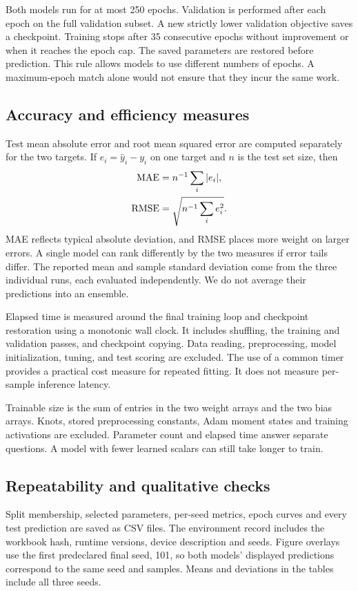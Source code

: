 \documentclass[11pt,twocolumn,letterpaper]{article}
\begin{document}
Both models run for at most 250 epochs. Validation is performed after each epoch on the full validation subset. A new strictly lower validation objective saves a checkpoint. Training stops after 35 consecutive epochs without improvement or when it reaches the epoch cap. The saved parameters are restored before prediction. This rule allows models to use different numbers of epochs. A maximum-epoch match alone would not ensure that they incur the same work.

\subsection{Accuracy and efficiency measures}
Test mean absolute error and root mean squared error are computed separately for the two targets. If \(e_i=\widehat y_i-y_i\) on one target and \(n\) is the test set size, then
\begin{align}
 {\rm MAE}&=n^{-1}\sum_i |e_i|,\\
 {\rm RMSE}&=\sqrt{n^{-1}\sum_i e_i^2}.
\end{align}
MAE reflects typical absolute deviation, and RMSE places more weight on larger errors. A single model can rank differently by the two measures if error tails differ. The reported mean and sample standard deviation come from the three individual runs, each evaluated independently. We do not average their predictions into an ensemble.

Elapsed time is measured around the final training loop and checkpoint restoration using a monotonic wall clock. It includes shuffling, the training and validation passes, and checkpoint copying. Data reading, preprocessing, model initialization, tuning, and test scoring are excluded. The use of a common timer provides a practical cost measure for repeated fitting. It does not measure per-sample inference latency.

Trainable size is the sum of entries in the two weight arrays and the two bias arrays. Knots, stored preprocessing constants, Adam moment states and training activations are excluded. Parameter count and elapsed time answer separate questions. A model with fewer learned scalars can still take longer to train.

\subsection{Repeatability and qualitative checks}
Split membership, selected parameters, per-seed metrics, epoch curves and every test prediction are saved as CSV files. The environment record includes the workbook hash, runtime versions, device description and seeds. Figure overlays use the first predeclared final seed, 101, so both models' displayed predictions correspond to the same seed and samples. Means and deviations in the tables include all three seeds.
\end{document}
